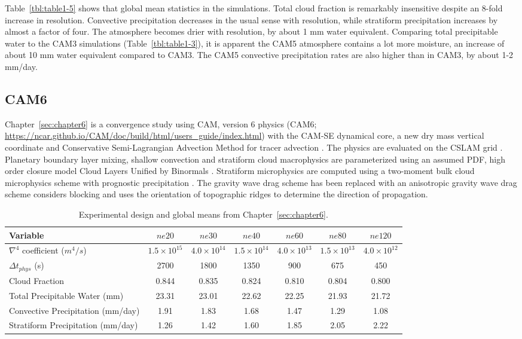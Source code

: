 Table~\ref{tbl:table1-5} shows that global mean statistics in the simulations. Total cloud fraction is remarkably insensitive despite an 8-fold increase in resolution. Convective precipitation decreases in the usual sense with resolution, while stratiform precipitation increases by almost a factor of four. The atmosphere becomes drier with resolution, by about 1 mm water equivalent. Comparing total precipitable water to the CAM3 simulations (Table~\ref{tbl:table1-3}), it is apparent the CAM5 atmosphere contains a lot more moisture, an increase of about 10 mm water equivalent compared to CAM3. The CAM5 convective precipitation rates are also higher than in CAM3, by about 1-2 mm/day.

\subsection{CAM6}

Chapter~\ref{sec:chapter6} is a convergence study using CAM, version 6 physics (CAM6; \url{https://ncar.github.io/CAM/doc/build/html/users_guide/index.html}) with the CAM-SE dynamical core, a new dry mass vertical coordinate \citep{LetAl2018JAMES} and Conservative Semi-Lagrangian Advection Method for tracer advection \citep[CSLAM; ][]{LTOUNGK2017MWR}. The physics are evaluated on the CSLAM grid \citep{HL2018MWR}. Planetary boundary layer mixing, shallow convection and stratiform cloud macrophysics are parameterized using an assumed PDF, high order closure model Cloud Layers Unified by Binormals \citep[CLUBB][]{GETAL2002JAS,BOG2013JCLIM}. Stratiform microphysics are computed using a two-moment bulk cloud microphysics scheme with prognostic precipitation \citep{MG2}. The gravity wave drag scheme has been replaced with an anisotropic gravity wave drag scheme considers blocking and uses the orientation of topographic ridges to determine the direction of propagation.

 \begin{table}
 \caption{Experimental design and global means from Chapter~\ref{sec:chapter6}.}
 \centering
 \scriptsize
 \begin{tabular}{lcccccc}
 \hline
 Variable & $ne20$ & $ne30$ & $ne40$ & $ne60$ & $ne80$ & $ne120$ \\
   \hline
   $\nabla^{4}$ coefficient ($m^4/s$) & $1.5 \times 10^{15}$ & $4.0 \times 10^{14}$ & $1.5 \times 10^{14}$ & $4.0 \times 10^{13}$  & $1.5 \times 10^{13}$ & $4.0 \times 10^{12}$\\
    $\Delta t_{phys}$ (s) & 2700 & 1800 & 1350 & 900 & 675 & 450 \\
   Cloud Fraction & 0.844 & 0.835 & 0.824 & 0.810 & 0.804 & 0.800 \\ 
   Total Precipitable Water (mm) & 23.31& 23.01 & 22.62 & 22.25 & 21.93 & 21.72 \\
   Convective Precipitation (mm/day) & 1.91 & 1.83 & 1.68 & 1.47 & 1.29 & 1.08 \\
   Stratiform Precipitation (mm/day) & 1.26 & 1.42 & 1.60 & 1.85 & 2.05 & 2.22 \\      
 \hline
 \end{tabular}
 \label{tbl:table1-6}
 \end{table}

